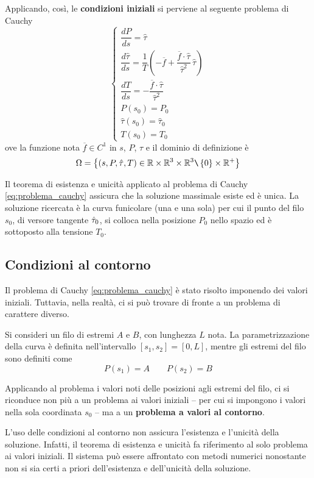 Applicando, così, le \textbf{condizioni iniziali} si perviene al seguente problema di Cauchy
\begin{equation}
	\label{eq:problema_cauchy}
	\begin{cases}
		\dfrac{dP}{ds} = \hat{\tau}\\[1.5ex]
		\dfrac{d\hat{\tau}}{ds} = \dfrac{1}{T} \left(-\overline{f} + \dfrac{\overline{f}\cdot\hat{\tau}}{\hat{\tau}^2}\,\hat{\tau}\right)\\[1.5ex]
		\dfrac{dT}{ds} = -\dfrac{\overline{f}\cdot\hat{\tau}}{\hat{\tau}^2}\\[1.5ex]
		P(s_0) = P_0\\
		\hat{\tau}(s_0)= \hat{\tau}_0\\
		T(s_0)=T_0
	\end{cases}
\end{equation}
ove la funzione nota $\overline{f}\in C^1$ in $s$, $P$, $\hat{\tau}$ e il dominio di definizione è
\[
\Omega = \left\{(s, P, \hat{\tau}, T)\in \mathbb{R}\times\mathbb{R}^3\times \mathbb{R}^3\texttt{\textbackslash}\left\{0\right\}\times \mathbb{R}^+\right\}
\]

Il teorema di esistenza e unicità applicato al problema di Cauchy \eqref{eq:problema_cauchy} assicura che la soluzione massimale esiste ed è unica.
La soluzione ricercata è la curva funicolare (una e una sola) per cui il punto del filo $s_0$, di versore tangente $\hat{\tau}_0$, si colloca nella posizione $P_0$ nello spazio ed è sottoposto alla tensione $T_0$.

\subsection{Condizioni al contorno}\label{section:condizioni_contorno}
Il problema di Cauchy \eqref{eq:problema_cauchy} è stato risolto imponendo dei valori iniziali. Tuttavia, nella realtà, ci si può trovare di fronte a un problema di carattere diverso.

Si consideri un filo di estremi $A$ e $B$, con lunghezza $L$ nota. La parametrizzazione della curva è definita nell'intervallo $[s_1, s_2] = [0, L]$, mentre gli estremi del filo sono definiti come
\[
P(s_1)	= A \qquad P(s_2)=B
\]

Applicando al problema i valori noti delle posizioni agli estremi del filo, ci si riconduce non più a un problema ai valori iniziali -- per cui si impongono i valori nella sola coordinata $s_0$ -- ma a un \textbf{problema a valori al contorno}.

L'uso delle condizioni al contorno non assicura l'esistenza e l'unicità della soluzione. Infatti, il teorema di esistenza e unicità fa riferimento al solo problema ai valori iniziali. Il sistema può essere affrontato con metodi numerici nonostante non si sia certi a priori dell'esistenza e dell'unicità della soluzione.

